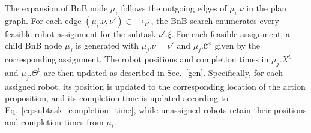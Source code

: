 \documentclass[lettersize,journal]{IEEEtran}
\theoremstyle{italiclemma}
\theoremstyle{italiclemma}
\theoremstyle{definition}
\begin{document}
The expansion of  BnB node $\mu_i$ follows the outgoing edges of $\mu_i.\nu$ in the plan graph. For each edge
$(\mu_i.\nu,\nu')\in \rightarrow_P$, the BnB search enumerates every feasible robot assignment for the subtask $\nu'.\xi$. For each feasible assignment, a child BnB node $\mu_j$ is generated with $\mu_j.\nu=\nu'$  and $\mu_j.\mathcal C^b$ given by the corresponding assignment. The robot positions and completion times in $\mu_j.X^b$ and
$\mu_j.\Theta^b$ are then updated as described in
Sec.~\ref{gen}. Specifically, for each assigned robot, its position is updated to the corresponding location of the action proposition, and its completion time is
updated according to Eq.~\eqref{eq:subtask_completion_time}, while unassigned robots retain their positions and completion times from $\mu_i$.






\end{document}
